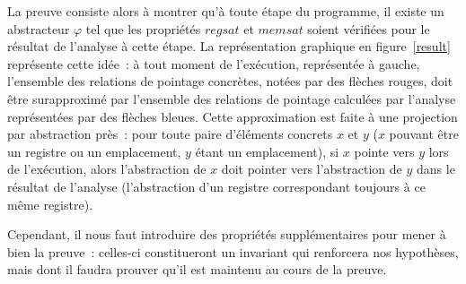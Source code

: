 \documentclass{article}
\begin{document}
La preuve consiste alors à montrer qu'à toute étape du programme, il existe un
abstracteur $\varphi$ tel que les propriétés $regsat$ et
$memsat$ soient vérifiées pour le résultat de l'analyse à cette
étape. La représentation graphique en figure~\ref{result} représente cette
idée~: à tout moment de l'exécution, représentée à gauche, l'ensemble des
relations de pointage concrètes, notées par des flèches rouges, doit être
surapproximé par l'ensemble des relations de pointage calculées par l'analyse
représentées par des flèches bleues. Cette approximation est faite à une
projection par abstraction près~: pour toute paire d'éléments concrets $x$ et
$y$ ($x$ pouvant être un registre ou un emplacement, $y$ étant un emplacement),
si $x$ pointe vers $y$ lors de l'exécution, alors l'abstraction de $x$ doit
pointer vers l'abstraction de $y$ dans le résultat de l'analyse (l'abstraction
d'un registre correspondant toujours à ce même registre).

Cependant, il nous faut introduire des propriétés supplémentaires pour mener à
bien la preuve~: celles-ci constitueront un invariant qui renforcera nos
hypothèses, mais dont il faudra prouver qu'il est maintenu au cours de la
preuve.
\end{document}
